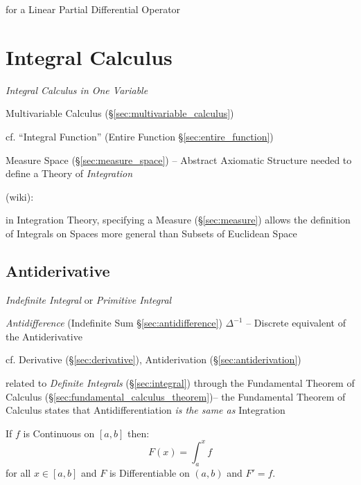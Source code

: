 for a Linear Partial Differential Operator



\section{Integral Calculus}\label{sec:integral_calculus}

\emph{Integral Calculus in One Variable}

\fist Multivariable Calculus (\S\ref{sec:multivariable_calculus})

cf. ``Integral Function'' (Entire Function \S\ref{sec:entire_function})

\fist Measure Space (\S\ref{sec:measure_space}) -- Abstract Axiomatic Structure
needed to define a Theory of \emph{Integration}

(wiki):

in Integration Theory, specifying a Measure (\S\ref{sec:measure}) allows the
definition of Integrals on Spaces more general than Subsets of Euclidean Space



\subsection{Antiderivative}\label{sec:antiderivative}

\emph{Indefinite Integral} or \emph{Primitive Integral}

\fist \emph{Antidifference} (Indefinite Sum \S\ref{sec:antidifference})
$\Delta^{-1}$ -- Discrete equivalent of the Antiderivative

\fist cf. Derivative (\S\ref{sec:derivative}), Antiderivation
(\S\ref{sec:antiderivation})

\fist related to \emph{Definite Integrals} (\S\ref{sec:integral}) through the
Fundamental Theorem of Calculus (\S\ref{sec:fundamental_calculus_theorem})-- the
Fundamental Theorem of Calculus states that Antidifferentiation \emph{is the
  same as} Integration

If $f$ is Continuous on $[a,b]$ then:
\[
  F(x) = \int_a^x f
\]
for all $x \in [a,b]$ and $F$ is Differentiable on $(a,b)$ and $F' = f$.

